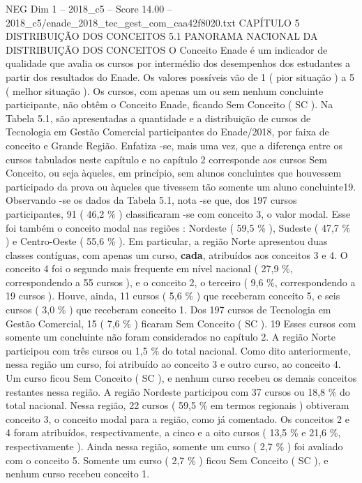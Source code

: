 \begin{textsample}{NEG Dim 1 – 2018\_c5 – Score 14.00 – 2018\_c5/enade\_2018\_tec\_gest\_com\_caa42f8020.txt}  \label{ex:f1_neg_380}
CAPÍTULO 5 DISTRIBUIÇÃO DOS CONCEITOS 5.1 PANORAMA NACIONAL DA DISTRIBUIÇÃO DOS CONCEITOS O Conceito Enade é um indicador de qualidade que avalia os cursos por intermédio dos desempenhos dos estudantes a partir dos resultados do Enade.
Os valores possíveis vão de 1 ( pior situação ) a 5 ( melhor situação ).
Os cursos, com apenas um ou sem nenhum concluinte participante, não obtêm o Conceito Enade, ficando Sem Conceito ( SC ).
Na Tabela 5.1, são apresentadas a quantidade e a distribuição de cursos de Tecnologia em Gestão Comercial participantes do Enade/2018, por faixa de conceito e Grande Região.
Enfatiza -se, mais uma vez, que a diferença entre os cursos tabulados neste capítulo e no capítulo 2 corresponde aos cursos Sem Conceito, ou seja àqueles, em princípio, sem alunos concluintes que houvessem participado da prova ou àqueles que tivessem tão somente um aluno concluinte19.
Observando -se os dados da Tabela 5.1, nota -se que, dos 197 cursos participantes, 91 ( 46,2 \% ) classificaram -se com conceito 3, o valor modal.
Esse foi também o conceito modal nas regiões : Nordeste ( 59,5 \% ), Sudeste ( 47,7 \% ) e Centro-Oeste ( 55,6 \% ).
Em particular, a região Norte apresentou duas classes contíguas, com apenas um curso, \textbf{cada}, atribuídos aos conceitos 3 e 4.
O conceito 4 foi o segundo mais frequente em nível nacional ( 27,9 \%, correspondendo a 55 cursos ), e o conceito 2, o terceiro ( 9,6 \%, correspondendo a 19 cursos ).
Houve, ainda, 11 cursos ( 5,6 \% ) que receberam conceito 5, e seis cursos ( 3,0 \% ) que receberam conceito 1.
Dos 197 cursos de Tecnologia em Gestão Comercial, 15 ( 7,6 \% ) ficaram Sem Conceito ( SC ). 19 Esses cursos com somente um concluinte não foram considerados no capítulo 2.
A região Norte participou com três cursos ou 1,5 \% do total nacional.
Como dito anteriormente, nessa região um curso, foi atribuído ao conceito 3 e outro curso, ao conceito 4.
Um curso ficou Sem Conceito ( SC ), e nenhum curso recebeu os demais conceitos restantes nessa região.
A região Nordeste participou com 37 cursos ou 18,8 \% do total nacional.
Nessa região, 22 cursos ( 59,5 \% em termos regionais ) obtiveram conceito 3, o conceito modal para a região, como já comentado.
Os conceitos 2 e 4 foram atribuídos, respectivamente, a cinco e a oito cursos ( 13,5 \% e 21,6 \%, respectivamente ).
Ainda nessa região, somente um curso ( 2,7 \% ) foi avaliado com o conceito 5.
Somente um curso ( 2,7 \% ) ficou Sem Conceito ( SC ), e nenhum curso recebeu conceito 1.

\end{textsample}
